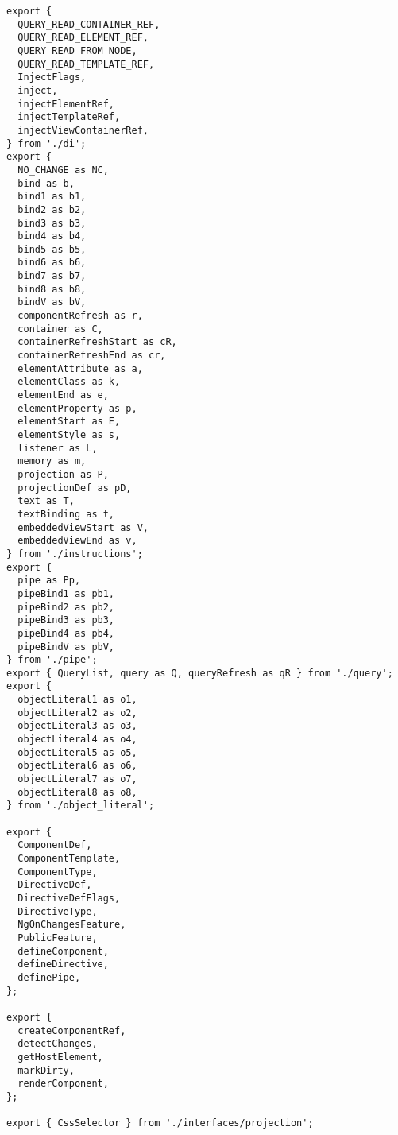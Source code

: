 \begin{verbatim}
export {
  QUERY_READ_CONTAINER_REF,
  QUERY_READ_ELEMENT_REF,
  QUERY_READ_FROM_NODE,
  QUERY_READ_TEMPLATE_REF,
  InjectFlags,
  inject,
  injectElementRef,
  injectTemplateRef,
  injectViewContainerRef,
} from './di';
export {
  NO_CHANGE as NC,
  bind as b,
  bind1 as b1,
  bind2 as b2,
  bind3 as b3,
  bind4 as b4,
  bind5 as b5,
  bind6 as b6,
  bind7 as b7,
  bind8 as b8,
  bindV as bV,
  componentRefresh as r,
  container as C,
  containerRefreshStart as cR,
  containerRefreshEnd as cr,
  elementAttribute as a,
  elementClass as k,
  elementEnd as e,
  elementProperty as p,
  elementStart as E,
  elementStyle as s,
  listener as L,
  memory as m,
  projection as P,
  projectionDef as pD,
  text as T,
  textBinding as t,
  embeddedViewStart as V,
  embeddedViewEnd as v,
} from './instructions';
export {
  pipe as Pp,
  pipeBind1 as pb1,
  pipeBind2 as pb2,
  pipeBind3 as pb3,
  pipeBind4 as pb4,
  pipeBindV as pbV,
} from './pipe';
export { QueryList, query as Q, queryRefresh as qR } from './query';
export {
  objectLiteral1 as o1,
  objectLiteral2 as o2,
  objectLiteral3 as o3,
  objectLiteral4 as o4,
  objectLiteral5 as o5,
  objectLiteral6 as o6,
  objectLiteral7 as o7,
  objectLiteral8 as o8,
} from './object_literal';

export {
  ComponentDef,
  ComponentTemplate,
  ComponentType,
  DirectiveDef,
  DirectiveDefFlags,
  DirectiveType,
  NgOnChangesFeature,
  PublicFeature,
  defineComponent,
  defineDirective,
  definePipe,
};

export {
  createComponentRef,
  detectChanges,
  getHostElement,
  markDirty,
  renderComponent,
};

export { CssSelector } from './interfaces/projection';
\end{verbatim}
